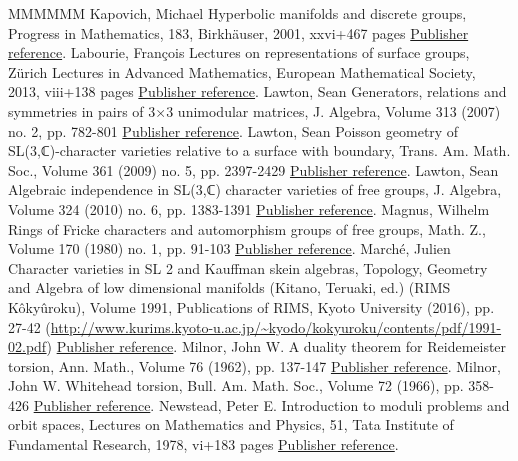 \documentclass[11pt]{article}
\theoremstyle{definition}
\numberwithin{equation}{section}
\numberwithin{figure}{section}
\numberwithin{table}{section}
\begin{document}
\begin{thebibliography}{MMMMMM}
 Kapovich, Michael Hyperbolic manifolds and discrete groups, Progress in Mathematics, 183, Birkhäuser, 2001, xxvi+467 pages \href{https://ahl.centre-mersenne.org/item/AHL_2020__3__341_0/#Kapovich}{Publisher reference}.
 Labourie, François Lectures on representations of surface groups, Zürich Lectures in Advanced Mathematics, European Mathematical Society, 2013, viii+138 pages \href{https://ahl.centre-mersenne.org/item/AHL_2020__3__341_0/#LabourieSG}{Publisher reference}.
 Lawton, Sean Generators, relations and symmetries in pairs of 3×3 unimodular matrices, J. Algebra, Volume 313 (2007) no. 2, pp. 782-801 \href{https://ahl.centre-mersenne.org/item/AHL_2020__3__341_0/#LawtonJA}{Publisher reference}.
 Lawton, Sean Poisson geometry of SL(3,ℂ)-character varieties relative to a surface with boundary, Trans. Am. Math. Soc., Volume 361 (2009) no. 5, pp. 2397-2429 \href{https://ahl.centre-mersenne.org/item/AHL_2020__3__341_0/#LawtonP}{Publisher reference}.
 Lawton, Sean Algebraic independence in SL(3,ℂ) character varieties of free groups, J. Algebra, Volume 324 (2010) no. 6, pp. 1383-1391 \href{https://ahl.centre-mersenne.org/item/AHL_2020__3__341_0/#LawtonAI}{Publisher reference}.
 Magnus, Wilhelm Rings of Fricke characters and automorphism groups of free groups, Math. Z., Volume 170 (1980) no. 1, pp. 91-103 \href{https://ahl.centre-mersenne.org/item/AHL_2020__3__341_0/#Magnus}{Publisher reference}.
 Marché, Julien Character varieties in SL 2  and Kauffman skein algebras, Topology, Geometry and Algebra of low dimensional manifolds (Kitano, Teruaki, ed.) (RIMS Kôkyûroku), Volume 1991, Publications of RIMS, Kyoto University (2016), pp. 27-42 (\url{http://www.kurims.kyoto-u.ac.jp/~kyodo/kokyuroku/contents/pdf/1991-02.pdf}) \href{https://ahl.centre-mersenne.org/item/AHL_2020__3__341_0/#Marche2016}{Publisher reference}.
 Milnor, John W. A duality theorem for Reidemeister torsion, Ann. Math., Volume 76 (1962), pp. 137-147 \href{https://ahl.centre-mersenne.org/item/AHL_2020__3__341_0/#MilnorDuality}{Publisher reference}.
 Milnor, John W. Whitehead torsion, Bull. Am. Math. Soc., Volume 72 (1966), pp. 358-426 \href{https://ahl.centre-mersenne.org/item/AHL_2020__3__341_0/#MilnorBullAMS}{Publisher reference}.
 Newstead, Peter E. Introduction to moduli problems and orbit spaces, Lectures on Mathematics and Physics, 51, Tata Institute of Fundamental Research, 1978, vi+183 pages \href{https://ahl.centre-mersenne.org/item/AHL_2020__3__341_0/#Newstead}{Publisher reference}.

\end{thebibliography}
\end{document}
